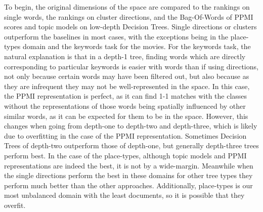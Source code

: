 To begin, the original dimensions of the space are compared to the rankings on single words, the rankings on cluster directions, and the Bag-Of-Words of PPMI scores and topic models on low-depth Decision Trees. Single directions or clusters outperform the baselines in most cases, with the exceptions being in the place-types domain and the keywords task for the movies. For the keywords task, the natural explanation is that in a depth-1 tree, finding words which are directly corresponding to particular keywords is easier with words than if using directions, not only because certain words may have been filtered out, but also because as they are infrequent they may not be well-represented in the space. In this case, the PPMI representation is perfect, as it can find 1-1 matches with the classes without the representations of those words being spatially influenced by other similar words, as it can be expected for them to be in the space. However, this changes when going from depth-one to depth-two and depth-three, which is likely  due to overfitting in the case of the PPMI representation. Sometimes Decision Trees of depth-two outperform those of depth-one, but generally depth-three trees perform best.  In the case of the place-types, although topic models and PPMI representations are indeed the best, it is not by a wide-margin. Meanwhile when the single directions perform the best in these domains for other tree types they perform much better than the other approaches. Additionally, place-types is our most unbalanced domain with the least documents, so it is possible that they overfit. 




